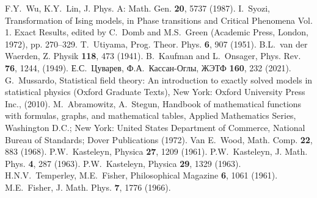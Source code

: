 \documentclass[utf8,12pt]{jetp}
\begin{document}
\begin{references}
 F.Y.~Wu, K.Y.~Lin, J. Phys. A: Math. Gen. \textbf{20}, 5737 (1987).
 I.~Syozi, Transformation of Ising models, in Phase transitions and Critical Phenomena Vol. 1. Exact Results, edited by C.~Domb and M.S.~Green (Academic Press, London, 1972), pp. 270–329.
 T.~Utiyama, Prog. Theor. Phys. \textbf{6}, 907 (1951).
 B.L.~van der Waerden, Z. Physik \textbf{118}, 473 (1941).
 B.~Kaufman and L.~Onsager, Phys. Rev. \textbf{76}, 1244, (1949).
 Е.С.~Цуварев, Ф.А.~Кассан-Оглы, ЖЭТФ \textbf{160}, 232 (2021).
  G.~Mussardo, Statistical field theory: An introduction to exactly solved models in statistical physics (Oxford Graduate Texts), New York: Oxford University Press Inc., (2010).
 M.~Abramowitz, A.~Stegun, Handbook of mathematical functions with formulas, graphs, and mathematical tables, Applied Mathematics Series, Washington D.C.; New York: United States Department of Commerce, National Bureau of Standards; Dover Publications (1972).
 Van E.~Wood, Math. Comp. \textbf{22}, 883 (1968).
 P.W.~Kasteleyn, Physica \textbf{27}, 1209 (1961).
 P.W.~Kasteleyn, J. Math. Phys. \textbf{4}, 287 (1963).
 P.W.~Kasteleyn, Physica \textbf{29}, 1329 (1963).
 H.N.V.~Temperley, M.E.~Fisher, Philosophical Magazine \textbf{6}, 1061 (1961).
 M.E.~Fisher, J. Math. Phys. \textbf{7}, 1776 (1966).





\end{references}
	
\end{document}
